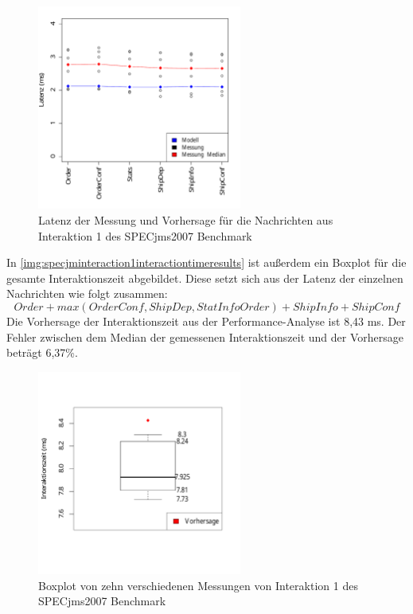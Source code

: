 \begin{figure}
\center
  \includegraphics[width=0.6\textwidth]{images/evaluation/specjmsresults/interaktion1.pdf}
  \caption{Latenz der Messung und Vorhersage für die Nachrichten aus Interaktion 1 des SPECjms2007 Benchmark}
  \label{img:specjminteraction1results}
\end{figure}

In \autoref{img:specjminteraction1interactiontimeresults} ist außerdem ein Boxplot für die gesamte Interaktionszeit abgebildet. Diese setzt sich aus der Latenz der einzelnen Nachrichten wie folgt zusammen: \[Order + max(OrderConf, ShipDep, StatInfoOrder) + ShipInfo + ShipConf\] 
Die Vorhersage der Interaktionszeit aus der Performance-Analyse ist 8,43 ms. Der Fehler zwischen dem Median der gemessenen Interaktionszeit und der Vorhersage beträgt 6,37\%.

\begin{figure}
\center
  \includegraphics[width=0.6\textwidth]{images/evaluation/specjmsresults/interaktion1InteractionTime.pdf}
  \caption{Boxplot von zehn verschiedenen Messungen von Interaktion 1 des SPECjms2007 Benchmark}
  \label{img:specjminteraction1interactiontimeresults}
\end{figure}

